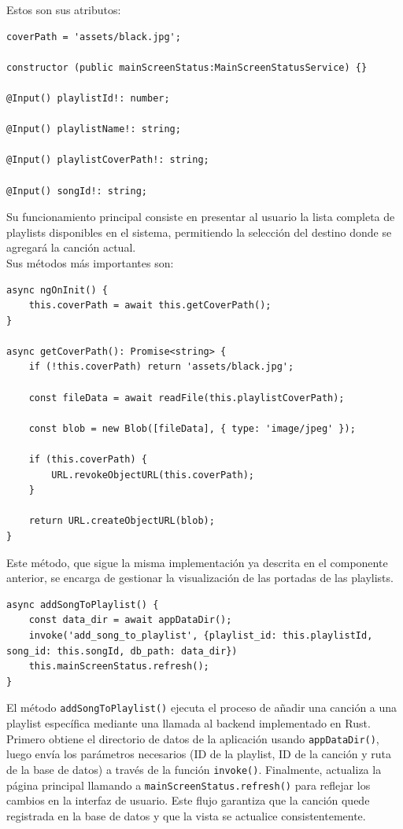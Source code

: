 \documentclass[11pt, a4paper]{article}
\begin{document}
                Estos son sus atributos:

                \begin{lstlisting}[caption={Atributos Playlist Button}]
coverPath = 'assets/black.jpg';

constructor (public mainScreenStatus:MainScreenStatusService) {}

@Input() playlistId!: number;

@Input() playlistName!: string;

@Input() playlistCoverPath!: string;

@Input() songId!: string;
                \end{lstlisting}

                Su funcionamiento principal consiste en presentar al usuario la lista completa de playlists disponibles en el sistema, permitiendo la selección del destino donde se agregará la canción actual. \\

                Sus métodos más importantes son:

                \begin{lstlisting}[caption={getCoverPath()}]
async ngOnInit() {
    this.coverPath = await this.getCoverPath();
}

async getCoverPath(): Promise<string> {
    if (!this.coverPath) return 'assets/black.jpg';

    const fileData = await readFile(this.playlistCoverPath);

    const blob = new Blob([fileData], { type: 'image/jpeg' });

    if (this.coverPath) {
        URL.revokeObjectURL(this.coverPath);
    }

    return URL.createObjectURL(blob);
}
                \end{lstlisting}

                Este método, que sigue la misma implementación ya descrita en el componente anterior, se encarga de gestionar la visualización de las portadas de las playlists.

                \begin{lstlisting}[caption={addSongToPlaylist()}]
async addSongToPlaylist() {
    const data_dir = await appDataDir();
    invoke('add_song_to_playlist', {playlist_id: this.playlistId, song_id: this.songId, db_path: data_dir})
    this.mainScreenStatus.refresh();
}
                \end{lstlisting}

                El método \texttt{addSongToPlaylist()} ejecuta el proceso de añadir una canción a una playlist específica mediante una llamada al backend implementado en Rust. Primero obtiene el directorio de datos de la aplicación usando \texttt{appDataDir()}, luego envía los parámetros necesarios (ID de la playlist, ID de la canción y ruta de la base de datos) a través de la función \texttt{invoke()}. Finalmente, actualiza la página principal llamando a \texttt{mainScreenStatus.refresh()} para reflejar los cambios en la interfaz de usuario. Este flujo garantiza que la canción quede registrada en la base de datos y que la vista se actualice consistentemente.
\end{document}
